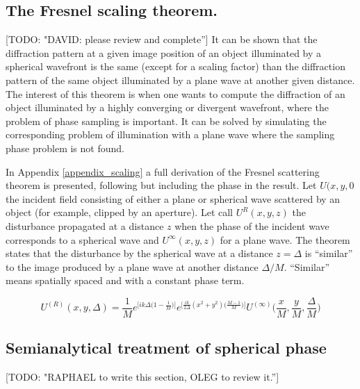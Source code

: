 \documentclass{iucr}              %
\newcommand{\todo}[1]{{\color{red}[TODO: "#1'']}}
\begin{document}
\subsection{The Fresnel scaling theorem.}
\todo{DAVID: please review and complete}
It can be shown that the diffraction pattern at a given image position of an object illuminated by a spherical wavefront is the same (except for a scaling factor) than the diffraction pattern of the same object illuminated by a plane wave at another given distance. 
The interest of this theorem is when one wants to compute the diffraction of an object illuminated by a highly converging or divergent wavefront, where the problem of phase sampling is important. It can be solved by simulating the corresponding problem of illumination with a plane wave where the sampling phase problem is not found.

In Appendix \ref{appendix_scaling} a full derivation of the Fresnel scattering theorem is presented, following \cite{paganin_book} but including the phase in the result. Let $U(x,y,0$ the incident field consisting of either a plane or spherical wave scattered by an object (for example, clipped by an aperture). Let call $U^R(x,y,z)$ the disturbance propagated at a distance $z$ when the phase of the incident wave corresponds to a spherical wave and $U^\infty(x,y,z)$ for a plane wave. The theorem states that the disturbance by the spherical wave at a distance $z=\Delta$ is ``similar'' to the image produced by a plane wave at another distance $\Delta/M$. ``Similar'' means spatially spaced and with a constant phase term.

\begin{equation}
	U^{(R)}(x, y, \Delta)= \frac{1}{M} e^{\big[ik\Delta \big({1-\frac{1}{M}}\big)\big]} e^{\big[\frac{ik}{2\Delta}(x^2+y^2)\big(\frac{M-1}{M}\big)\big]} U^{(\infty)}\Big(\frac{x}{M}, \frac{y}{M}, \frac{\Delta}{M}\Big)
\end{equation}


\subsection{Semianalytical treatment of spherical phase}

\todo{RAPHAEL to write this section, OLEG to review it.}
\end{document}
